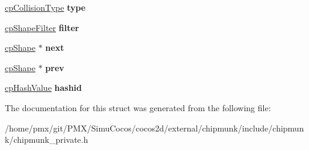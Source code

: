 \begin{DoxyCompactItemize}
\item 
\mbox{\label{structcpShape_abae1c01e2b8c70cb15bf313816c8af60}} 
\hyperlink{group__basicTypes_gae83e2f50965eb441e36ffff1e32e6d02}{cp\+Collision\+Type} {\bfseries type}
\item 
\mbox{\label{structcpShape_a2a5150b1f512b355038355b46c447ae7}} 
\hyperlink{structcpShapeFilter}{cp\+Shape\+Filter} {\bfseries filter}
\item 
\mbox{\label{structcpShape_aeaa2c975dac6ceabd10f3764663af882}} 
\hyperlink{structcpShape}{cp\+Shape} $\ast$ {\bfseries next}
\item 
\mbox{\label{structcpShape_a3de18846aa74c07f22bb4aa1b473a505}} 
\hyperlink{structcpShape}{cp\+Shape} $\ast$ {\bfseries prev}
\item 
\mbox{\label{structcpShape_a98ce6465c208b0e053a4606bcb7e26c4}} 
\hyperlink{group__basicTypes_gae7eb4775a9f43914a15553ca65a048f4}{cp\+Hash\+Value} {\bfseries hashid}
\end{DoxyCompactItemize}


The documentation for this struct was generated from the following file\+:\begin{DoxyCompactItemize}
\item 
/home/pmx/git/\+P\+M\+X/\+Simu\+Cocos/cocos2d/external/chipmunk/include/chipmunk/chipmunk\+\_\+private.\+h\end{DoxyCompactItemize}
